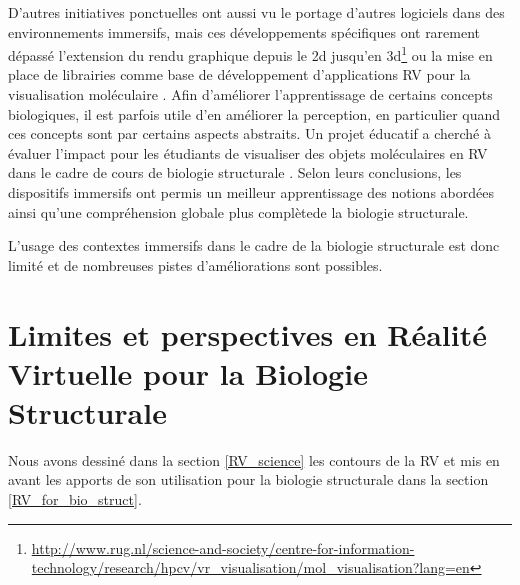 D'autres initiatives ponctuelles ont aussi vu le portage d'autres logiciels dans des environnements immersifs, mais ces développements spécifiques ont rarement dépassé l'extension du rendu graphique depuis le 2d jusqu'en 3d\footnote{\url{http://www.rug.nl/science-and-society/centre-for-information-technology/research/hpcv/vr\_visualisation/mol\_visualisation?lang=en}} ou la mise en place de librairies comme base de développement d'applications RV pour la visualisation moléculaire \cite{salvadori_moka:_2014}.  Afin d'améliorer l'apprentissage de certains concepts biologiques, il est parfois utile d'en améliorer la perception, en particulier quand ces concepts sont par certains aspects abstraits. Un projet éducatif a cherché à évaluer l'impact pour les étudiants de visualiser des objets moléculaires en RV dans le cadre de cours de biologie structurale \cite{tan_use_2013}. Selon leurs conclusions, les dispositifs immersifs ont permis un meilleur apprentissage des notions abordées ainsi qu'une compréhension globale plus complètede la biologie structurale.

L'usage des contextes immersifs dans le cadre de la biologie structurale est donc limité et de nombreuses pistes d'améliorations sont possibles.



\section{Limites et perspectives en Réalité Virtuelle pour la Biologie Structurale} %
\label{sec:RV_perspectives}

Nous avons dessiné dans la section \ref{RV_science} les contours de la RV et mis en avant les apports de son utilisation pour la biologie structurale dans la section \ref{RV_for_bio_struct}. 



